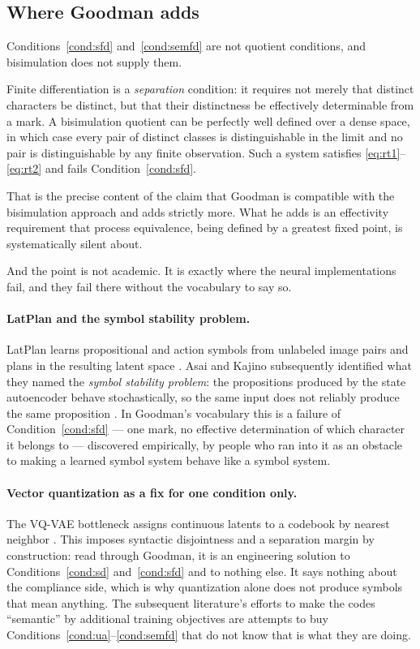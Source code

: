 \subsection{Where Goodman adds}
\label{sec:adds}

Conditions~\ref{cond:sfd} and~\ref{cond:semfd} are not quotient
conditions, and bisimulation does not supply them.

\begin{observation}
\label{obs:sep}
Finite differentiation is a \emph{separation} condition: it
requires not merely that distinct characters be distinct, but that
their distinctness be effectively determinable from a mark.
A bisimulation quotient can be perfectly well defined over a dense
space, in which case every pair of distinct classes is
distinguishable in the limit and no pair is distinguishable by any
finite observation.
Such a system satisfies \eqref{eq:rt1}--\eqref{eq:rt2} and fails
Condition~\ref{cond:sfd}.
\end{observation}

\noindent
That is the precise content of the claim that Goodman is compatible
with the bisimulation approach and adds strictly more.
What he adds is an effectivity requirement that process
equivalence, being defined by a greatest fixed point, is
systematically silent about.

And the point is not academic.
It is exactly where the neural implementations fail, and they fail
there without the vocabulary to say so.

\paragraph{LatPlan and the symbol stability problem.}
LatPlan learns propositional and action symbols from unlabeled
image pairs and plans in the resulting latent space
\cite{asai2018}.
Asai and Kajino subsequently identified what they named the
\emph{symbol stability problem}: the propositions produced by the
state autoencoder behave stochastically, so the same input does not
reliably produce the same proposition \cite{asai2019}.
In Goodman's vocabulary this is a failure of
Condition~\ref{cond:sfd} --- one mark, no effective determination
of which character it belongs to --- discovered empirically, by
people who ran into it as an obstacle to making a learned symbol
system behave like a symbol system.

\paragraph{Vector quantization as a fix for one condition only.}
The VQ-VAE bottleneck assigns continuous latents to a codebook by
nearest neighbor \cite{oord2017}.
This imposes syntactic disjointness and a separation margin by
construction: read through Goodman, it is an engineering solution
to Conditions~\ref{cond:sd} and~\ref{cond:sfd} and to nothing else.
It says nothing about the compliance side, which is why
quantization alone does not produce symbols that mean anything.
The subsequent literature's efforts to make the codes ``semantic''
by additional training objectives are attempts to buy
Conditions~\ref{cond:ua}--\ref{cond:semfd} that do not know that is
what they are doing.


